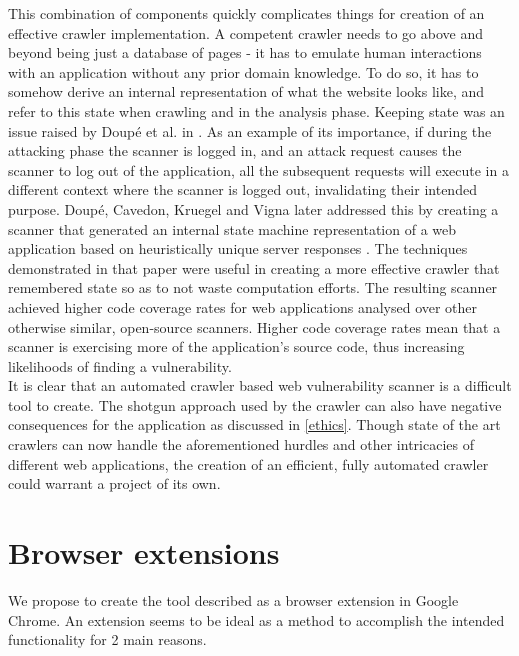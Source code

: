 This combination of components quickly complicates things for creation of an effective crawler implementation. A competent crawler needs to go above and beyond being just a database of pages - it has to emulate human interactions with an application without any prior domain knowledge. To do so, it has to somehow derive an internal representation of what the website looks like, and refer to this state when crawling and in the analysis phase. Keeping state was an issue raised by Doup\'e et al. in \cite{whyJohnnyCantPentest}. As an example of its importance, if during the attacking phase the scanner is logged in, and an attack request causes the scanner to log out of the application, all the subsequent requests will execute in a different context where the scanner is logged out, invalidating their intended purpose. Doup\'e, Cavedon, Kruegel and Vigna later addressed this by creating a scanner that generated an internal state machine representation of a web application based on heuristically unique server responses \cite{stateAwareBlackBoxWebVulnScanner}. The techniques demonstrated in that paper were useful in creating a more effective crawler that remembered state so as to not waste computation efforts. The resulting scanner achieved higher code coverage rates for web applications analysed over other otherwise similar, open-source scanners. Higher code coverage rates mean that a scanner is exercising more of the application's source code, thus increasing likelihoods of finding a vulnerability. \\

It is clear that an automated crawler based web vulnerability scanner is a difficult tool to create. The shotgun approach used by the crawler can also have negative consequences for the application as discussed in \ref{ethics}. Though state of the art crawlers can now handle the aforementioned hurdles and other intricacies of different web applications, the creation of an efficient, fully automated crawler could warrant a project of its own. \\

 
\section{Browser extensions} \label{browserExtensions}

We propose to create the tool described as a browser extension in Google Chrome. An extension seems to be ideal as a method to accomplish the intended functionality for 2 main reasons.

